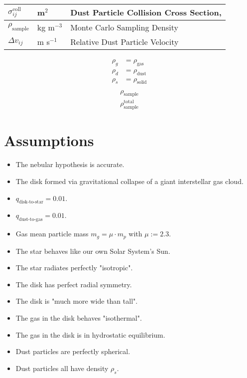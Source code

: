 \begin{table}[h!]
\begin{tabular}{|l|l|l|}
            \\ \hline
            $\sigma^\text{coll}_{ij}$   & m$^2$         & Dust Particle Collision Cross Section,
            \\ \hline
            $\rho_\text{sample}$& kg m$^{-3}$           & Monte Carlo Sampling Density
            \\ \hline
            $\Delta v_{ij}$     & m s$^{-1}$            & Relative Dust Particle Velocity
            \\ \hline
        \end{tabular}
    \end{table}

    \begin{align}
        \rho_g &= \rho_\text{gas} \\
        \rho_d &= \rho_\text{dust} \\
        \rho_s &= \rho_\text{solid} \\
    \end{align}
    \begin{align}
        \rho_\text{sample} \\
        \rho_\text{sample}^\text{total} 
    \end{align}
    
\section{Assumptions}

    \begin{itemize}
        \item The nebular hypothesis is accurate. 
        \item The disk formed via gravitational collapse of a giant interstellar gas cloud.
        \item $q_\text{disk-to-star}=0.01$.
        \item $q_\text{dust-to-gas}=0.01$.
        \item Gas mean particle mass $m_g=\mu\cdot m_p$ with $\mu:=2.3$.
        \item The star behaves like our own Solar System's Sun.
        \item The star radiates perfectly "isotropic".
        \item The disk has perfect radial symmetry.
        \item The disk is "much more wide than tall".
        \item The gas in the disk behaves "isothermal".
        \item The gas in the disk is in hydrostatic equilibrium.
        \item Dust particles are perfectly spherical.
        \item Dust particles all have density $\rho_s$.
    \end{itemize}


